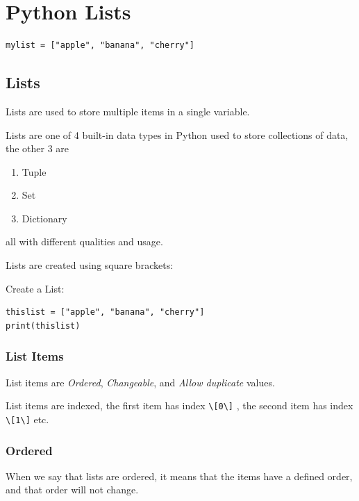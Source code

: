 \documentclass[12pt,a4paper]{article}
\newcommand{\code}[1]{%
	\colorbox{backcolour}{\lstinline{#1}}%
}
\begin{document}
\section{Python Lists}\label{pyLists}
\begin{lstlisting}
mylist = ["apple", "banana", "cherry"]
\end{lstlisting}

\subsection{Lists}
Lists are used to store multiple items in a single variable.

Lists are one of 4 built-in data types in Python used to store collections of
data, the other 3 are
\begin{multicols}{2}
	\begin{enumerate}
\item Tuple
\item Set
\item Dictionary
	\end{enumerate}
\end{multicols}
all with different qualities and usage.

Lists are created using square brackets:

\begin{ebox}
Create a List:
	\begin{lstlisting}
thislist = ["apple", "banana", "cherry"]
print(thislist)
	\end{lstlisting}
\tcblower
	\begin{vercode}
	\end{vercode}
\end{ebox}

\subsubsection{List Items}
List items are \textit{Ordered}, \textit{Changeable},
and \textit{Allow duplicate} values.

List items are indexed, the first item has index \code{\[0\]}, the second item
has index \code{\[1\]} etc.
\subsubsection{Ordered}

When we say that lists are ordered, it means that the items have a defined
order, and that order will not change.
\end{document}
